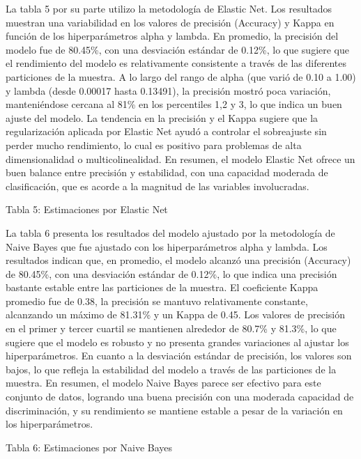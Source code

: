 \documentclass[12pt,a4paper,onecolumn]{article}
\begin{document}
La tabla 5 por su parte utilizo la metodología de Elastic Net. Los resultados muestran una variabilidad en los valores de precisión (Accuracy) y Kappa en función de los hiperparámetros alpha y lambda. En promedio, la precisión del modelo fue de 80.45\%, con una desviación estándar de 0.12\%, lo que sugiere que el rendimiento del modelo es relativamente consistente a través de las diferentes particiones de la muestra. A lo largo del rango de alpha (que varió de 0.10 a 1.00) y lambda (desde 0.00017 hasta 0.13491), la precisión mostró poca variación, manteniéndose cercana al 81\% en los percentiles 1,2 y 3, lo que indica un buen ajuste del modelo. La tendencia en la precisión y el Kappa sugiere que la regularización aplicada por Elastic Net ayudó a controlar el sobreajuste sin perder mucho rendimiento, lo cual es positivo para problemas de alta dimensionalidad o multicolinealidad. En resumen, el modelo Elastic Net ofrece un buen balance entre precisión y estabilidad, con una capacidad moderada de clasificación, que es acorde a la magnitud de las variables involucradas.

{\color{blue} Tabla 5: Estimaciones por Elastic Net}

La tabla 6 presenta los resultados del modelo ajustado por la metodología de Naive Bayes que fue ajustado con los hiperparámetros alpha y lambda. Los resultados indican que, en promedio, el modelo alcanzó una precisión (Accuracy) de 80.45\%, con una desviación estándar de 0.12\%, lo que indica una precisión bastante estable entre las particiones de la muestra. El coeficiente Kappa promedio fue de 0.38, la precisión se mantuvo relativamente constante, alcanzando un máximo de 81.31\% y un Kappa de 0.45. Los valores de precisión en el primer y tercer cuartil se mantienen alrededor de 80.7\% y 81.3\%, lo que sugiere que el modelo es robusto y no presenta grandes variaciones al ajustar los hiperparámetros. En cuanto a la desviación estándar de precisión, los valores son bajos, lo que refleja la estabilidad del modelo a través de las particiones de la muestra. En resumen, el modelo Naive Bayes parece ser efectivo para este conjunto de datos, logrando una buena precisión con una moderada capacidad de discriminación, y su rendimiento se mantiene estable a pesar de la variación en los hiperparámetros.

{\color{blue} Tabla 6: Estimaciones por Naive Bayes}
\end{document}
